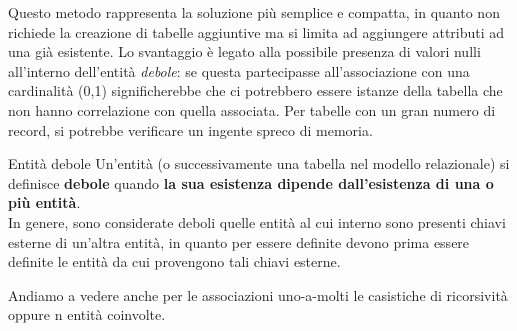 \documentclass[12pt]{report}
\begin{document}
	Questo metodo rappresenta la soluzione più semplice e compatta, in quanto non richiede la creazione di tabelle aggiuntive ma si limita ad aggiungere attributi ad una già esistente.
	Lo svantaggio è legato alla possibile presenza di valori nulli all'interno dell'entità \textit{debole}: se questa partecipasse all'associazione con una cardinalità (0,1) significherebbe che ci potrebbero essere istanze della tabella che non hanno correlazione con quella associata. Per tabelle con un gran numero di record, si potrebbe verificare un ingente spreco di memoria.
	
	\begin{definizione}{Entità debole}{}
		Un'entità (o successivamente una tabella nel modello relazionale) si definisce \textbf{debole} quando \textbf{la sua esistenza dipende dall'esistenza di una o più entità}.\\
		In genere, sono considerate deboli quelle entità al cui interno sono presenti chiavi esterne di un'altra entità, in quanto per essere definite devono prima essere definite le entità da cui provengono tali chiavi esterne.
	\end{definizione}
	
	Andiamo a vedere anche per le associazioni uno-a-molti le casistiche di ricorsività oppure n entità coinvolte.
	
\end{document}
